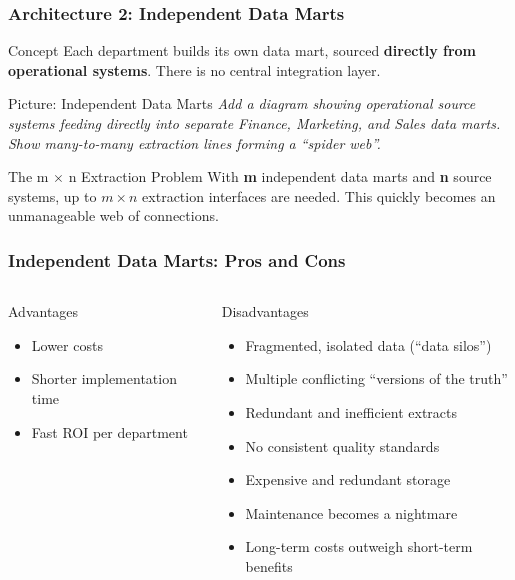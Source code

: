 \begin{frame}
  \frametitle{Architecture 2: Independent Data Marts}

  \begin{block}{Concept}
    Each department builds its own data mart, sourced
    \textbf{directly from operational systems}.
    There is no central integration layer.
  \end{block}

  \begin{alertblock}{Picture: Independent Data Marts}
    \textit{Add a diagram showing operational source systems feeding
    directly into separate Finance, Marketing, and Sales data marts.
    Show many-to-many extraction lines forming a ``spider web''.}
  \end{alertblock}

  \begin{block}{The m $\times$ n Extraction Problem}
    With \textbf{m} independent data marts and \textbf{n} source systems,
    up to $m \times n$ extraction interfaces are needed.
    This quickly becomes an unmanageable web of connections.
  \end{block}
\end{frame}

\begin{frame}
  \frametitle{Independent Data Marts: Pros and Cons}

  \begin{columns}[T]
    \begin{block}{Advantages}
      \begin{itemize}
        \item Lower costs
        \item Shorter implementation time
        \item Fast ROI per department
      \end{itemize}
    \end{block}

    \begin{alertblock}{Disadvantages}
      \begin{itemize}
        \item Fragmented, isolated data (``data silos'')
        \item Multiple conflicting ``versions of the truth''
        \item Redundant and inefficient extracts
        \item No consistent quality standards
        \item Expensive and redundant storage
        \item Maintenance becomes a nightmare
        \item Long-term costs outweigh short-term benefits
      \end{itemize}
    \end{alertblock}
  \end{columns}
\end{frame}

